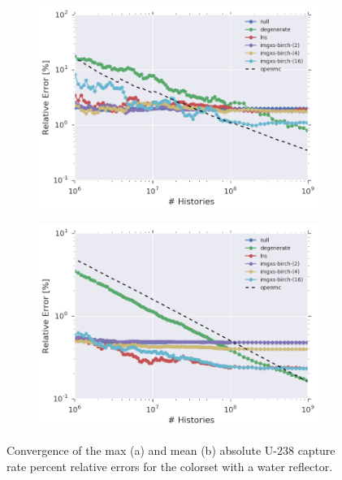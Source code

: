 \begin{figure}[h!]
\centering
\begin{subfigure}{\textwidth}
  \centering
  \includegraphics[width=0.9\linewidth]{figures/results/convergence/reflector/max-capt-err-evo}
  \caption{}
  \label{fig:chap11-refl-capture-converge-max}
\end{subfigure}
\begin{subfigure}{\textwidth}
  \centering
  \includegraphics[width=0.9\linewidth]{figures/results/convergence/reflector/mean-capt-err-evo}
  \caption{}
  \label{fig:chap11-refl-capture-converge-mean}
\end{subfigure}
\vspace{2mm}
\caption[U-238 capture rate error convergence with MC histories]{Convergence of the max (a) and mean (b) absolute U-238 capture rate percent relative errors for the colorset with a water reflector.}
\label{fig:chap11-refl-capture-converge}
\end{figure}

